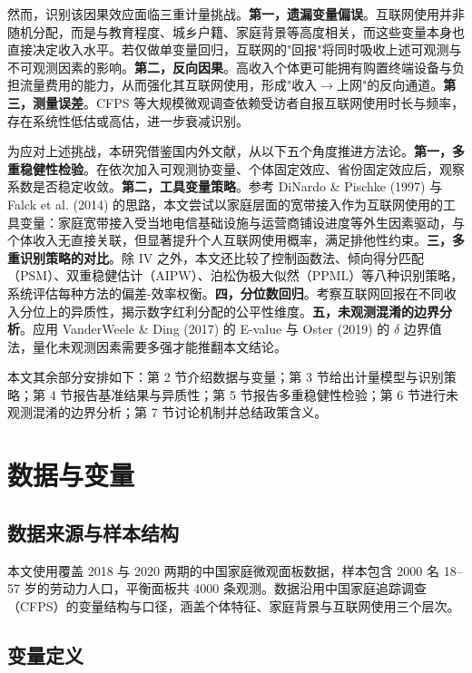 \documentclass[a4paper,11pt]{article}
\begin{document}
然而，识别该因果效应面临三重计量挑战。\textbf{第一，遗漏变量偏误}。互联网使用并非随机分配，而是与教育程度、城乡户籍、家庭背景等高度相关，而这些变量本身也直接决定收入水平。若仅做单变量回归，互联网的"回报"将同时吸收上述可观测与不可观测因素的影响。\textbf{第二，反向因果}。高收入个体更可能拥有购置终端设备与负担流量费用的能力，从而强化其互联网使用，形成"收入$\to$上网"的反向通道。\textbf{第三，测量误差}。CFPS 等大规模微观调查依赖受访者自报互联网使用时长与频率，存在系统性低估或高估，进一步衰减识别。

为应对上述挑战，本研究借鉴国内外文献，从以下五个角度推进方法论。\textbf{第一，多重稳健性检验}。在依次加入可观测协变量、个体固定效应、省份固定效应后，观察系数是否稳定收敛。\textbf{第二，工具变量策略}。参考 DiNardo \& Pischke (1997) 与 Falck et al. (2014) 的思路，本文尝试以家庭层面的宽带接入作为互联网使用的工具变量：家庭宽带接入受当地电信基础设施与运营商铺设进度等外生因素驱动，与个体收入无直接关联，但显著提升个人互联网使用概率，满足排他性约束。\textbf{三，多重识别策略的对比}。除 IV 之外，本文还比较了控制函数法、倾向得分匹配（PSM）、双重稳健估计（AIPW）、泊松伪极大似然（PPML）等八种识别策略，系统评估每种方法的偏差-效率权衡。\textbf{四，分位数回归}。考察互联网回报在不同收入分位上的异质性，揭示数字红利分配的公平性维度。\textbf{五，未观测混淆的边界分析}。应用 VanderWeele \& Ding (2017) 的 E-value 与 Oster (2019) 的 $\delta$ 边界值法，量化未观测因素需要多强才能推翻本文结论。

本文其余部分安排如下：第 2 节介绍数据与变量；第 3 节给出计量模型与识别策略；第 4 节报告基准结果与异质性；第 5 节报告多重稳健性检验；第 6 节进行未观测混淆的边界分析；第 7 节讨论机制并总结政策含义。

\section{数据与变量}

\subsection{数据来源与样本结构}

本文使用覆盖 2018 与 2020 两期的中国家庭微观面板数据，样本包含 2000 名 18--57 岁的劳动力人口，平衡面板共 4000 条观测。数据沿用中国家庭追踪调查（CFPS）的变量结构与口径，涵盖个体特征、家庭背景与互联网使用三个层次。

\subsection{变量定义}
\end{document}
